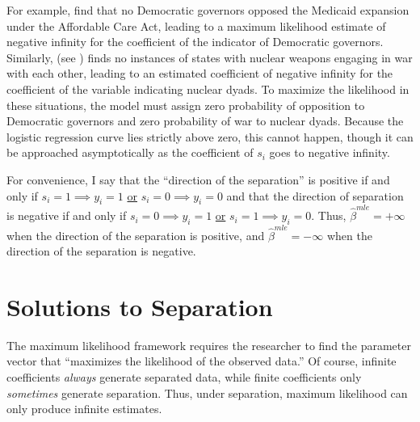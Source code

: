 \documentclass[12pt]{article}
\begin{document}
For example, \cite{BarrilleauxRainey2014} find that no Democratic governors opposed the Medicaid expansion under the Affordable Care Act, leading to a maximum likelihood estimate of negative infinity for the coefficient of the indicator of Democratic governors. 
Similarly, \cite{Rauchhaus2009} (see \citealt{BellMiller2015}) finds no instances of states with nuclear weapons engaging in war with each other, leading to an estimated coefficient of negative infinity for the coefficient of the variable indicating nuclear dyads. 
To maximize the likelihood in these situations, the model must assign zero probability of opposition to Democratic governors and zero probability of war to nuclear dyads. 
Because the logistic regression curve lies strictly above zero, this cannot happen, though it can be approached asymptotically as the coefficient of $s_i$ goes to negative infinity. 

For convenience, I say that the ``direction of the separation'' is positive if and only if $s_i = 1 \implies y_i = 1$ \underline{or} $s_i = 0 \implies y_i = 0$ and that the direction of separation is negative if and only if $s_i = 0 \implies y_i = 1$ \underline{or} $s_i = 1 \implies y_i = 0$. 
Thus, $\hat{\beta}^{mle} = +\infty$ when the direction of the separation is positive, and $\hat{\beta}^{mle} = -\infty$ when the direction of the separation is negative.

\section*{Solutions to Separation}

The maximum likelihood framework requires the researcher to find the parameter vector that ``maximizes the likelihood of the observed data.'' 
Of course, infinite coefficients \textit{always} generate separated data, while finite coefficients only \emph{sometimes} generate separation. 
Thus, under separation, maximum likelihood can only produce infinite estimates.
\end{document}
